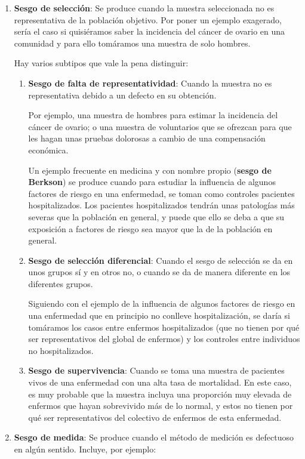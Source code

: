 \documentclass[
  spanish,
  letterpaper,
  DIV=11,
  numbers=noendperiod]{scrreprt}
\begin{document}
\begin{enumerate}
\def\labelenumi{\arabic{enumi}.}
\item
  \textbf{Sesgo de selección}: Se produce cuando la muestra seleccionada
  no es representativa de la población objetivo. Por poner un ejemplo
  exagerado, sería el caso si quisiéramos saber la incidencia del cáncer
  de ovario en una comunidad y para ello tomáramos una muestra de solo
  hombres.

  Hay varios subtipos que vale la pena distinguir:

  \begin{enumerate}
  \def\labelenumii{\alph{enumii}.}
  \item
    \textbf{Sesgo de falta de representatividad}: Cuando la muestra no
    es representativa debido a un defecto en su obtención.

    Por ejemplo, una muestra de hombres para estimar la incidencia del
    cáncer de ovario; o una muestra de voluntarios que se ofrezcan para
    que les hagan unas pruebas dolorosas a cambio de una compensación
    económica.

    Un ejemplo frecuente en medicina y con nombre propio (\textbf{sesgo
    de Berkson}) se produce cuando para estudiar la influencia de
    algunos factores de riesgo en una enfermedad, se toman como
    controles pacientes hospitalizados. Los pacientes hospitalizados
    tendrán unas patologías más severas que la población en general, y
    puede que ello se deba a que su exposición a factores de riesgo sea
    mayor que la de la población en general.
  \item
    \textbf{Sesgo de selección diferencial}: Cuando el sesgo de
    selección se da en unos grupos sí y en otros no, o cuando se da de
    manera diferente en los diferentes grupos.

    Siguiendo con el ejemplo de la influencia de algunos factores de
    riesgo en una enfermedad que en principio no conlleve
    hospitalización, se daría si tomáramos los casos entre enfermos
    hospitalizados (que no tienen por qué ser representativos del global
    de enfermos) y los controles entre individuos no hospitalizados.
  \item
    \textbf{Sesgo de supervivencia}: Cuando se toma una muestra de
    pacientes vivos de una enfermedad con una alta tasa de mortalidad.
    En este caso, es muy probable que la muestra incluya una proporción
    muy elevada de enfermos que hayan sobrevivido más de lo normal, y
    estos no tienen por qué ser representativos del colectivo de
    enfermos de esta enfermedad.
  \end{enumerate}
\item
  \textbf{Sesgo de medida}: Se produce cuando el método de medición es
  defectuoso en algún sentido. Incluye, por ejemplo:


\end{enumerate}
\end{document}
